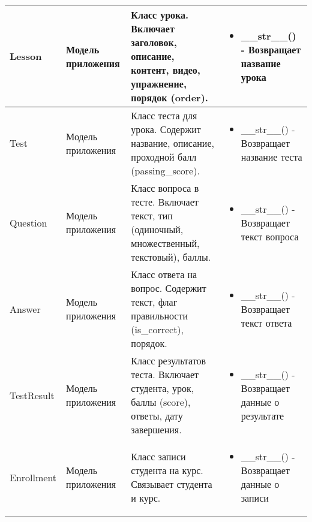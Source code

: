 \begin{xltabular}{\textwidth}{|>{\raggedright\arraybackslash}p{2.5cm}|>{\raggedright\arraybackslash}p{2.5cm}|X|X|}
	Lesson & Модель приложения & 
	Класс урока. Включает заголовок, описание, контент, видео, упражнение, порядок (order). & 
	\begin{itemize}[leftmargin=*,noitemsep,topsep=0pt]
		\item \_\_str\_\_() - Возвращает название урока
	\end{itemize} \\
	\hline
	
	Test & Модель приложения & 
	Класс теста для урока. Содержит название, описание, проходной балл (passing\_score). & 
	\begin{itemize}[leftmargin=*,noitemsep,topsep=0pt]
		\item \_\_str\_\_() - Возвращает название теста
	\end{itemize} \\
	\hline
	
	Question & Модель приложения & 
	Класс вопроса в тесте. Включает текст, тип (одиночный, множественный, текстовый), баллы. & 
	\begin{itemize}[leftmargin=*,noitemsep,topsep=0pt]
		\item \_\_str\_\_() - Возвращает текст вопроса
	\end{itemize} \\
	\hline
	
	Answer & Модель приложения & 
	Класс ответа на вопрос. Содержит текст, флаг правильности (is\_correct), порядок. & 
	\begin{itemize}[leftmargin=*,noitemsep,topsep=0pt]
		\item \_\_str\_\_() - Возвращает текст ответа
	\end{itemize} \\
	\hline
	
	TestResult & Модель приложения & 
	Класс результатов теста. Включает студента, урок, баллы (score), ответы, дату завершения. & 
	\begin{itemize}[leftmargin=*,noitemsep,topsep=0pt]
		\item \_\_str\_\_() - Возвращает данные о результате
	\end{itemize} \\
	\hline
	
	Enrollment & Модель приложения & 
	Класс записи студента на курс. Связывает студента и курс. & 
	\begin{itemize}[leftmargin=*,noitemsep,topsep=0pt]
		\item \_\_str\_\_() - Возвращает данные о записи
	\end{itemize} \\
	\hline
	

\end{xltabular}
